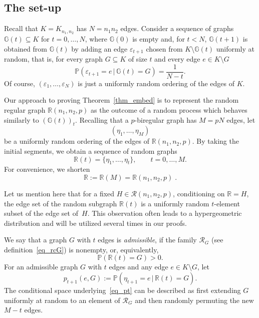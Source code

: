 \documentclass[12pt,reqno]{amsart}
\newcommand{\rc}{{\mathcal{R}}}
\newcommand{\rcnnp}{\rc(n_1,n_2,p)}
\newcommand{\Prob} {\mathbb {P}}
\newcommand{\prob}[1]{\Prob\left(#1\right)}
\newcommand{\Pc}[2]{\prob{#1\,|\,#2}}
\newcommand{\eps} {\varepsilon}
\newcommand{\R} {\mathbb R}
\newcommand{\Rnnp}{\R(n_1,n_2,p)}
\newcommand{\G} {\mathbb G}
\newcommand{\Knn} {K_{n_1,n_2}}
\theoremstyle{definition}
\begin{document}
\subsection{The set-up}
\label{ss_crucial_setup}
Recall that $K = \Knn$ has $N = n_1n_2$ edges.
Consider a sequence of graphs $\G(t) \subseteq K$ for $t = 0, \dots , N$, where $\G(0)$ is empty and, for $t < N$, $\G(t + 1)$ is obtained from $\G(t)$ by adding an edge $\eps_{t + 1}$ chosen from $K \setminus \G(t)$ uniformly at random, that is,
for every graph $G \subseteq K$ of size $t$ and  every edge $e \in K \setminus G$
\begin{equation}
  \label{eq_PG}
\Pc{\varepsilon_{t+1} = e}{\G(t) = G} = \frac{1}{N - t}.
\end{equation}
Of course, $(\varepsilon_1, \dots, \varepsilon_N)$ is just a uniformly random ordering of the edges of $K$.

Our approach to proving Theorem~\ref{thm_embed} is to represent the random regular graph $\Rnnp$ as the
outcome of a random process which behaves similarly to $(\G(t))_t$. Recalling that a $p$-biregular graph has $M = pN$ edges, let
\begin{equation*}
(\eta_1, \dots, \eta_M)
\end{equation*}
be a uniformly random ordering of the edges of $\Rnnp$.
By taking  the initial segments, we obtain a sequence of random graphs
\begin{equation*}
	\R(t) = \{\eta_1, \dots, \eta_t\}, \qquad t = 0, \dots, M.
\end{equation*}
For convenience, we shorten
\[
  \R:= \R(M) = \Rnnp\;.
\]

Let us mention here that for a fixed $H \in \rcnnp$, conditioning on $\R = H$, the edge set of the random subgraph  $\R(t)$ is a uniformly random $t$-element subset of the edge set of~$H$. This observation often leads to a hypergeometric distribution and will be utilized several times in our  proofs.


We say that a graph $G$ with $t$ edges is \emph{admissible}, if the family $\rc_G$ (see definition~\eqref{eq_rcG}) is nonempty, or, equivalently,
\begin{equation*}
	\prob{\R(t) = G} > 0.
\end{equation*}
For an admissible graph $G$ with $t$ edges and any edge $ e \in K \setminus G$, let
\begin{equation}
  \label{eq_pt}
p_{t+1}(e,G) := \Pc{\eta_{t+1} = e}{\R(t) = G}.
\end{equation}
The conditional space underlying~\eqref{eq_pt} can be described as first extending $G$ uniformly at random to an element of $\rc_G$ and then randomly permuting the new $M-t$ edges.
\end{document}
